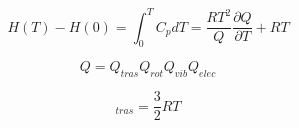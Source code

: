 \documentclass{beamer}
\begin{document}
\begin{frame}[fragile]

\begin{equation}
H(T)-H(0) = \int_{0} ^{T} C_{p} dT = \frac{RT^{2}}{Q} \frac{\partial Q}{\partial T} + RT
\label{eq:3.26}
\end{equation}


\begin{equation}
Q = Q_{tras}Q_{rot}Q_{vib}Q_{elec}
\label{eq:3.27}
\end{equation}

\begin{equation}
[H(T)-H(0)]_{tras} = \mathrm{\frac{3}{2}} RT
\label{eq:3.28}
\end{equation}


\end{frame}
\end{document}
